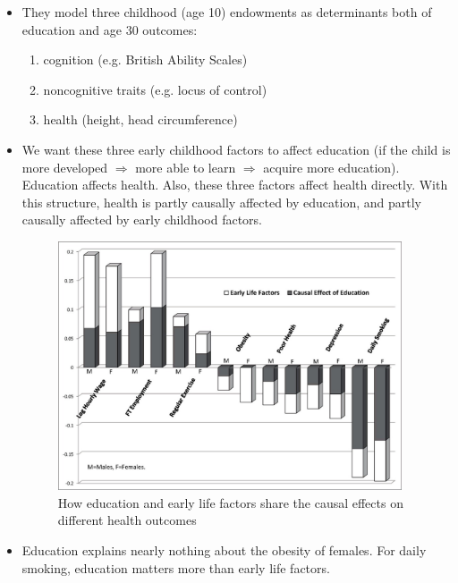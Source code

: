 \begin{itemize}
        \item They model three childhood (age 10) endowments as determinants both of education and age 30 outcomes:
        \begin{enumerate}
            \item cognition (e.g. British Ability Scales)
            \item noncognitive traits (e.g. locus of control)
            \item health (height, head circumference)
            \end{enumerate}
          \item We want these three early childhood factors to affect education (if the child is more developed $\Rightarrow$ more able to learn $\Rightarrow$ acquire more education).  Education affects health. Also, these three factors affect health directly. With this structure, health is partly causally affected by education, and partly causally affected by early childhood factors.

          
\begin{figure}[H]%
                \centering
                \includegraphics[width=4in]{images/ch3/44.png}
                \caption{How education and early life factors share the causal effects on different health outcomes}
                \label{fig:label}
            \end{figure}        
\end{itemize}

\begin{itemize}
\item Education explains nearly nothing about the obesity of females. For daily smoking, education matters more than early life factors.
\end{itemize}


